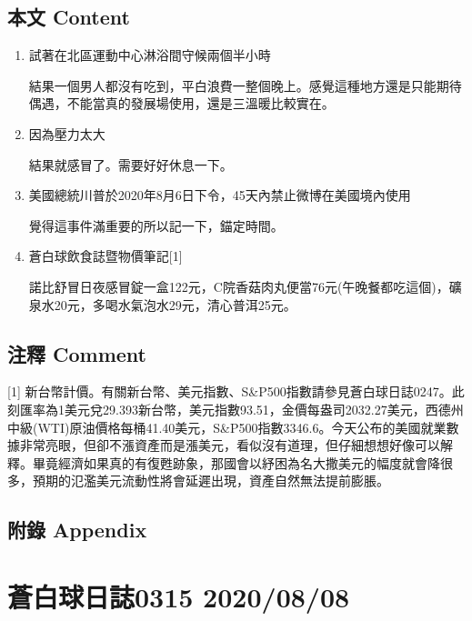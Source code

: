 \documentclass[a5paper, 11pt
]{book}
\begin{document}
\hypertarget{ux672cux6587-content-67}{%
\subsection{本文 Content}\label{ux672cux6587-content-67}}

\begin{enumerate}
\def\labelenumi{\arabic{enumi}.}
\item
  試著在北區運動中心淋浴間守候兩個半小時

  結果一個男人都沒有吃到，平白浪費一整個晚上。感覺這種地方還是只能期待偶遇，不能當真的發展場使用，還是三溫暖比較實在。
\item
  因為壓力太大

  結果就感冒了。需要好好休息一下。
\item
  美國總統川普於2020年8月6日下令，45天內禁止微博在美國境內使用

  覺得這事件滿重要的所以記一下，錨定時間。
\item
  蒼白球飲食誌暨物價筆記{[}1{]}

  諾比舒冒日夜感冒錠一盒122元，C院香菇肉丸便當76元(午晚餐都吃這個)，礦泉水20元，多喝水氣泡水29元，清心普洱25元。
\end{enumerate}

\hypertarget{ux6ce8ux91cb-comment-67}{%
\subsection{注釋 Comment}\label{ux6ce8ux91cb-comment-67}}

{[}1{]}
新台幣計價。有關新台幣、美元指數、S\&P500指數請參見蒼白球日誌0247。此刻匯率為1美元兌29.393新台幣，美元指數93.51，金價每盎司2032.27美元，西德州中級(WTI)原油價格每桶41.40美元，S\&P500指數3346.6。今天公布的美國就業數據非常亮眼，但卻不漲資產而是漲美元，看似沒有道理，但仔細想想好像可以解釋。畢竟經濟如果真的有復甦跡象，那國會以紓困為名大撒美元的幅度就會降很多，預期的氾濫美元流動性將會延遲出現，資產自然無法提前膨脹。

\hypertarget{ux9644ux9304-appendix-67}{%
\subsection{附錄 Appendix}\label{ux9644ux9304-appendix-67}}

\hypertarget{ux84bcux767dux7403ux65e5ux8a8c0315-20200808}{%
\section{蒼白球日誌0315
2020/08/08}\label{ux84bcux767dux7403ux65e5ux8a8c0315-20200808}}
\end{document}
